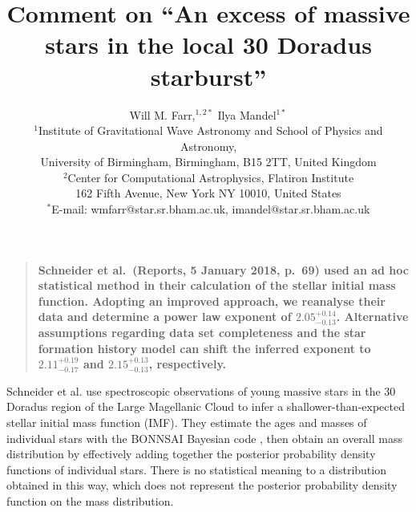 \documentclass[12pt]{article}
\title{Comment on ``An excess of massive stars in the local 30 Doradus starburst''}
\author{Will M. Farr,$^{1,2\ast}$ Ilya Mandel$^{1\ast}$\\
\normalsize{$^1$Institute of Gravitational Wave Astronomy and School of Physics and Astronomy,}\\
\normalsize{University of Birmingham, Birmingham, B15 2TT, United Kingdom}\\
\normalsize{$^2$Center for Computational Astrophysics, Flatiron Institute}\\
\normalsize{162 Fifth Avenue, New York NY 10010, United States} \\
\normalsize{$^\ast$E-mail: wmfarr@star.sr.bham.ac.uk, imandel@star.sr.bham.ac.uk}
}
\date{}
\newenvironment{sciabstract}{%
\begin{quote} \bf}
{\end{quote}}
\newcommand{\onesigrange}[3]{\ensuremath{#1^{+#2}_{-#3}}}
\newcommand{\alpharangeone}{\onesigrange{2.05}{0.14}{0.13}}
\newcommand{\alpharangethree}{\onesigrange{2.11}{0.19}{0.17}}
\newcommand{\alpharangefour}{\onesigrange{2.15}{0.13}{0.13}}
\begin{document}

\baselineskip24pt


\maketitle



\begin{sciabstract}
%
%
Schneider et al.~(Reports, 5 January 2018, p.~69) used an ad hoc statistical method in their calculation of the stellar initial mass function. Adopting an improved approach, we reanalyse their data and determine a power law exponent of $\alpharangeone$. Alternative assumptions regarding data set completeness and the star formation history model can shift the inferred exponent to $\alpharangethree$ and $\alpharangefour$, respectively.
\end{sciabstract}


Schneider et al.\cite{Schneider:2018} use spectroscopic observations of young massive stars in
the 30 Doradus region of the Large Magellanic Cloud to infer a
shallower-than-expected stellar initial mass function (IMF).  They estimate the ages and masses of individual
stars with the BONNSAI Bayesian code \cite{Schneider:2017}, then obtain
an overall mass distribution by effectively adding together the posterior
probability density functions of individual stars.  There is no statistical
meaning to a distribution obtained in this way, which does not represent the
posterior probability density function on the mass distribution.
\end{document}
